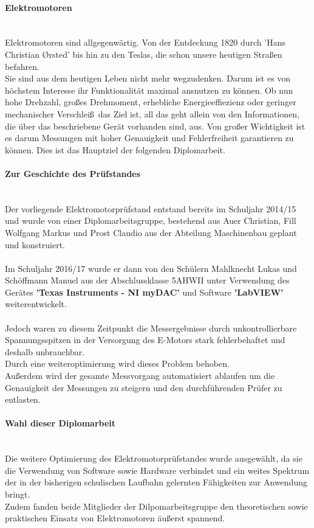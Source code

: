 \documentclass[12pt,a4paper]{article}
\begin{document}
\paragraph*{Elektromotoren}\mbox{}\\
	Elektromotoren sind allgegenwärtig. Von der Entdeckung 1820 durch 'Hans Christian \O rsted' bis hin 
	zu den Teslas, die schon unsere heutigen Stra\ss en befahren. \\
	Sie sind aus dem heutigen Leben nicht mehr wegzudenken. 
	Darum ist es von höchstem Interesse ihr Funktionalität maximal ansnutzen zu können. 
	Ob nun hohe Drehzahl, gro\ss es Drehmoment, erhebliche Energieeffiezienz oder 
	geringer mechanischer 	Verschlei\ss \ das Ziel ist, all das geht allein von den Informationen, die über das beschriebene
	Gerät vorhanden sind, aus. 
	Von gro\ss er Wichtigkeit ist es darum Messungen mit hoher Genauigkeit und Fehlerfreiheit garantieren zu können. 
	Dies ist das Hauptziel der folgenden Diplomarbeit. 
%
\paragraph*{Zur Geschichte des Prüfstandes}\mbox{}\\
	Der vorliegende Elektromotorprüfstand entstand bereits im Schuljahr 2014/15 
	und wurde von einer Diplomarbeitsgruppe, bestehend aus Auer Christian, Fill Wolfgang Markus und Prost Claudio aus 
	der Abteilung Maschinenbau geplant und konstruiert. \\\\
%	
	Im Schuljahr 2016/17 wurde er dann von den Schülern Mahlknecht Lukas und Schöffmann Manuel 
	aus der Abschlussklasse 5AHWII unter Verwendung des Gerätes {\bf 'Texas Instruments - NI myDAC'} und Software {\bf 'LabVIEW'} weiterentwickelt. \\\\
%
	Jedoch waren zu diesem Zeitpunkt die Messergebnisse durch unkontrollierbare Spannungsspitzen in der Versorgung 
	des E-Motors stark fehlerbehaftet und deshalb unbrauchbar. \\
	Durch eine weiteroptimierung wird dieses Problem behoben. \\
	Au\ss erdem wird der gesamte Messvorgang automatisiert ablaufen um die Genauigkeit der Messungen zu steigern 
	und den durchführenden Prüfer zu entlasten.
%	
\paragraph*{Wahl dieser Diplomarbeit}\mbox{}\\
	Die weitere Optimierung des Elektromotorprüfstandes wurde ausgewählt, da sie die Verwendung von 
	Software sowie Hardware verbindet und ein weites Spektrum der in der bisherigen schulischen Laufbahn 
	gelernten Fähigkeiten zur Anwendung bringt. \\
	Zudem fanden beide Mitglieder der Dilpomarbeitsgruppe den theoretischen sowie praktischen Einsatz von 
	Elektromotoren äu\ss erst spannend. \\
%
%
\newpage
\end{document}
